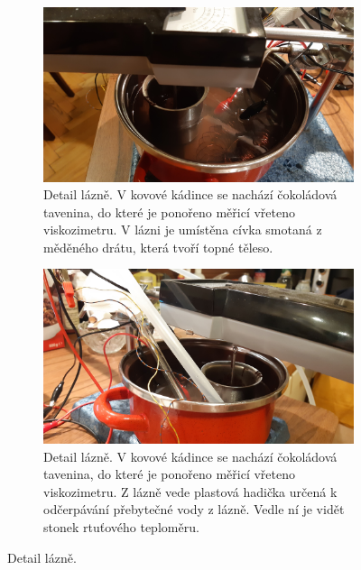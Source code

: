 \documentclass[12pt]{article}
\begin{document}
\begin{figure}[h!]
    \begin{subfigure}[b]{\textwidth}
        \includegraphics[width = \textwidth]{prilohy/lázeň_1.jpg}
        \caption{Detail lázně. V kovové kádince se nachází čokoládová tavenina, do které je ponořeno měřicí vřeteno viskozimetru. V lázni je umístěna cívka smotaná z měděného drátu, která tvoří topné těleso.}
    \end{subfigure}
    \hfill
    \begin{subfigure}[b]{\textwidth}
        \includegraphics[width = \textwidth]{prilohy/lázeň_2.jpg}
        \caption{Detail lázně. V kovové kádince se nachází čokoládová tavenina, do které je ponořeno měřicí vřeteno viskozimetru. Z lázně vede plastová hadička určená k odčerpávání přebytečné vody z lázně. Vedle ní je vidět stonek rtuťového teploměru.}
    \end{subfigure}
    \caption{Detail lázně.}
    \label{fig:lazen}
\end{figure}
\end{document}
